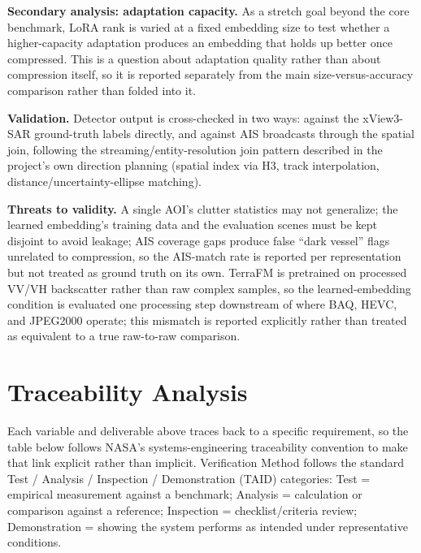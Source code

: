 \documentclass[11pt]{article}
\begin{document}
\textbf{Secondary analysis: adaptation capacity.} As a stretch goal beyond the core benchmark, LoRA rank is varied at a fixed embedding size to test whether a higher-capacity adaptation produces an embedding that holds up better once compressed. This is a question about adaptation quality rather than about compression itself, so it is reported separately from the main size-versus-accuracy comparison rather than folded into it.

\textbf{Validation.} Detector output is cross-checked in two ways: against the xView3-SAR ground-truth labels directly, and against AIS broadcasts through the spatial join, following the streaming/entity-resolution join pattern described in the project's own direction planning (spatial index via H3, track interpolation, distance/uncertainty-ellipse matching).

\textbf{Threats to validity.} A single AOI's clutter statistics may not generalize; the learned embedding's training data and the evaluation scenes must be kept disjoint to avoid leakage; AIS coverage gaps produce false ``dark vessel'' flags unrelated to compression, so the AIS-match rate is reported per representation but not treated as ground truth on its own. TerraFM is pretrained on processed VV/VH backscatter rather than raw complex samples, so the learned-embedding condition is evaluated one processing step downstream of where BAQ, HEVC, and JPEG2000 operate; this mismatch is reported explicitly rather than treated as equivalent to a true raw-to-raw comparison.

\section{Traceability Analysis}

Each variable and deliverable above traces back to a specific requirement, so the table below follows NASA's systems-engineering traceability convention to make that link explicit rather than implicit. Verification Method follows the standard Test / Analysis / Inspection / Demonstration (TAID) categories: Test = empirical measurement against a benchmark; Analysis = calculation or comparison against a reference; Inspection = checklist/criteria review; Demonstration = showing the system performs as intended under representative conditions.
\end{document}
